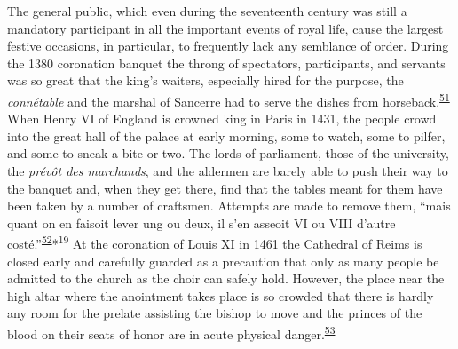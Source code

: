 The general public, which even during the seventeenth century was still
a mandatory participant in all the important events of royal life, cause
the largest festive occasions, in particular, to frequently lack any
semblance of order. During the 1380 coronation banquet the throng of
spectators, participants, and servants was so great that the king's
waiters, especially hired for the purpose, the
\emph{\protect\hypertarget{09_Chapter_Two__THE_CRAVING_FOR_A_M.xhtmlux5cux23page_52}{}{}connétable}
and the marshal of Sancerre had to serve the dishes from
horseback.\textsuperscript{\protect\hypertarget{09_Chapter_Two__THE_CRAVING_FOR_A_M.xhtmlux5cux23id_1986}{\protect\hyperlink{23_NOTES.xhtmlux5cux23id_1987}{51}}}
When Henry VI of England is crowned king in Paris in 1431, the people
crowd into the great hall of the palace at early morning, some to watch,
some to pilfer, and some to sneak a bite or two. The lords of
parliament, those of the university, the \emph{prévôt des marchands},
and the aldermen are barely able to push their way to the banquet and,
when they get there, find that the tables meant for them have been taken
by a number of craftsmen. Attempts are made to remove them, ``mais quant
on en faisoit lever ung ou deux, il s'en asseoit VI ou VIII d'autre
costé.''\textsuperscript{\protect\hypertarget{09_Chapter_Two__THE_CRAVING_FOR_A_M.xhtmlux5cux23id_1984}{\protect\hyperlink{23_NOTES.xhtmlux5cux23id_1985}{52}}}\protect\hypertarget{09_Chapter_Two__THE_CRAVING_FOR_A_M.xhtmlux5cux23id_2445}{\protect\hyperlink{23_NOTES.xhtmlux5cux23id_2446}{*\textsuperscript{19}}}
At the coronation of Louis XI in 1461 the Cathedral of Reims is closed
early and carefully guarded as a precaution that only as many people be
admitted to the church as the choir can safely hold. However, the place
near the high altar where the anointment takes place is so crowded that
there is hardly any room for the prelate assisting the bishop to move
and the princes of the blood on their seats of honor are in acute
physical
danger.\textsuperscript{\protect\hypertarget{09_Chapter_Two__THE_CRAVING_FOR_A_M.xhtmlux5cux23id_1982}{\protect\hyperlink{23_NOTES.xhtmlux5cux23id_1983}{53}}}

